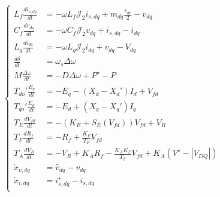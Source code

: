 \begin{equation}
    \begin{cases}
        L_f \frac{di_{s,dq}}{dt} &= -\omega L_f \mathcal{J}_2 i_{s,dq} + m_{dq}\frac{v_{dc}}{2} - v_{dq}\\
        C_f \frac{dv_{dq}}{dt} &= -\omega C_f \mathcal{J}_2 v_{dq} + i_{s,dq} - i_{dq}\\
        L_g \frac{di_{dq}}{dt} &= -\omega L_g \mathcal{J}_2 i_{dq} + v_{dq} - V_{dq}\\
        \frac{d\delta}{dt} &= \omega_s \Delta\omega\\
        M\frac{\Delta\omega}{dt} &= -D\Delta\omega + P^{\star} - P\\
        T_{do}' \frac{E_q}{dt} &= -E_q - (X_d - X_d')I_d + V_{fd}\\
        T_{qo}' \frac{E_d}{dt} &= -E_d + (X_q - X_q')I_q\\
        T_E \frac{dV_{fd}}{dt} &= -\left(K_E + S_E(V_{fd})\right)V_{fd} + V_R \\
        T_F \frac{dR_f}{dt} &= -R_f + \frac{K_F}{T_F}V_{fd} \\
        T_A \frac{dV_R}{dt} &= -V_R + K_A R_f - \frac{K_A K_F}{T_F}V_{fd} + K_A (V^{\star} - |V_{DQ}|)\\
        \dot{x}_{v,dq} &= \hat{v}_{dq} - v_{dq}\\
        \dot{x}_{i,dq} &= i_{s,dq}^{\star} - i_{s,dq}\\
    \end{cases}
    \label{eq:complete_model}
\end{equation}

